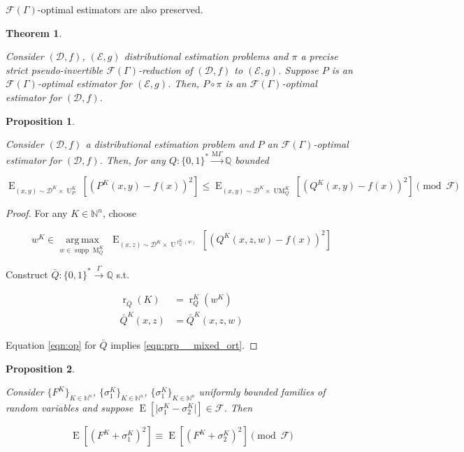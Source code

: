 \documentclass{article}
\numberwithin{equation}{section}
\theoremstyle{definition}
\theoremstyle{plain}
\newtheorem{theorem}{Theorem}[section]
\newtheorem{proposition}{Proposition}[section]
\newcommand{\Bool}{\{0,1\}}
\newcommand{\Words}{{\Bool^*}}
\DeclareMathOperator{\Supp}{supp}
\DeclareMathOperator{\E}{E}
\DeclareMathOperator{\R}{r}
\DeclareMathOperator{\M}{M}
\DeclareMathOperator{\UM}{UM}
\DeclareMathOperator{\Un}{U}
\newcommand{\Argmax}[1]{\underset{#1}{\operatorname{arg\,max}}\,}
\newcommand{\Nats}{\mathbb{N}}
\newcommand{\Rats}{\mathbb{Q}}
\newcommand{\Abs}[1]{\lvert #1 \rvert}
\newcommand{\Dist}{\mathcal{D}}
\newcommand{\MGrow}{\mathrm{M}\Gamma}
\newcommand{\Fall}{\mathcal{F}}
\newcommand{\EG}{\Fall(\Gamma)}
\newcommand{\Scheme}{\xrightarrow{\Gamma}}
\newcommand{\MScheme}{\xrightarrow{\MGrow}}
\begin{document}
$\EG$-optimal estimators are also preserved.

\begin{samepage}
\begin{theorem}
\label{thm:psp_reduce}

Consider $(\Dist,f)$, $(\mathcal{E},g)$ distributional estimation problems and $\pi$ a precise strict pseudo-invertible $\EG$-reduction of $(\Dist, f)$ to $(\mathcal{E}, g)$. Suppose $P$ is an $\EG$-optimal estimator for $(\mathcal{E}, g)$. Then, $P \circ \pi$ is an $\EG$-optimal estimator for $(\Dist, f)$.

\end{theorem}
\end{samepage}

\begin{samepage}
\begin{proposition}
\label{prp:mixed_opt}

Consider ${(\Dist,f)}$ a distributional estimation problem and ${P}$ an ${\EG}$-optimal estimator for ${(\Dist,f)}$. Then, for any $Q: \Words \MScheme \Rats$ bounded

\begin{equation}
\label{eqn:prp__mixed_ort}
\E_{(x,y) \sim \Dist^{K} \times \Un_P^K}[(P^K(x,y) - f(x))^2] \leq \E_{(x,y) \sim \Dist^{K} \times \UM_Q^K}[(Q^K(x,y)-f(x))^2] \pmod \Fall
\end{equation}

\end{proposition}
\end{samepage}

\begin{proof}

For any ${K \in \Nats^n}$, choose 

\[w^K \in \Argmax{w \in \Supp \M_Q^K} \E_{(x,z) \sim \Dist^{K} \times \Un^{\R_Q^K(w)}}[(Q^K(x,z,w)-f(x))^2]\]

Construct ${\bar{Q}: \Words \Scheme \Rats}$ s.t.

\begin{align*}
\R_{\bar{Q}}(K) &= \R_Q^K(w^K) \\
\bar{Q}^K(x,z) &= \bar{Q}^K(x,z,w)
\end{align*}

Equation \ref{eqn:op} for ${\bar{Q}}$ implies \ref{eqn:prp__mixed_ort}.
%
\end{proof}

\begin{samepage}
\begin{proposition}
\label{prp:sq_diff_cong}

Consider $\{F^K\}_{K \in \Nats^n}$, $\{\sigma_1^K\}_{K \in \Nats^n}$, $\{\sigma_1^K\}_{K \in \Nats^n}$ uniformly bounded families of random variables and suppose ${\E[\Abs{\sigma_1^K - \sigma_2^K}] \in \Fall}$. Then

\begin{equation}
\E[(F^K + \sigma_1^K)^2] \equiv \E[(F^K + \sigma_2^K)^2] \pmod \Fall
\end{equation}

\end{proposition}
\end{samepage}
\end{document}

